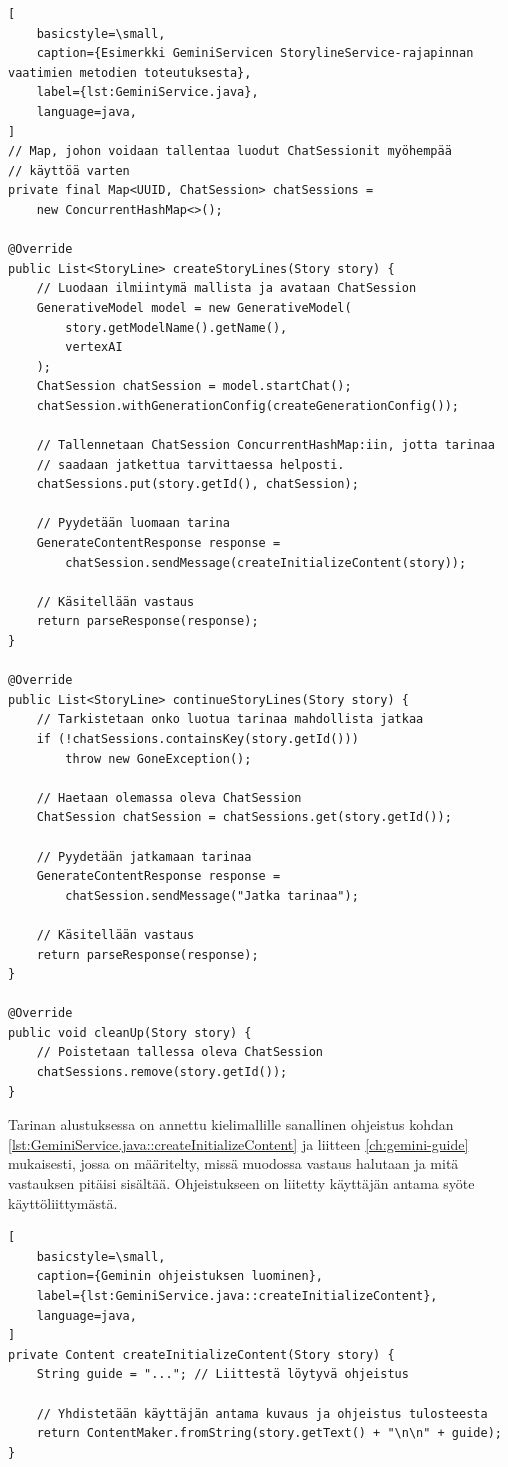 \begin{lstlisting}[
    basicstyle=\small,
    caption={Esimerkki GeminiServicen StorylineService-rajapinnan vaatimien metodien toteutuksesta},
    label={lst:GeminiService.java},
    language=java,
]
// Map, johon voidaan tallentaa luodut ChatSessionit myöhempää
// käyttöä varten
private final Map<UUID, ChatSession> chatSessions =
    new ConcurrentHashMap<>();

@Override
public List<StoryLine> createStoryLines(Story story) {
    // Luodaan ilmiintymä mallista ja avataan ChatSession
    GenerativeModel model = new GenerativeModel(
        story.getModelName().getName(),
        vertexAI
    );
    ChatSession chatSession = model.startChat();
    chatSession.withGenerationConfig(createGenerationConfig());

    // Tallennetaan ChatSession ConcurrentHashMap:iin, jotta tarinaa
    // saadaan jatkettua tarvittaessa helposti.
    chatSessions.put(story.getId(), chatSession);

    // Pyydetään luomaan tarina
    GenerateContentResponse response =
        chatSession.sendMessage(createInitializeContent(story));

    // Käsitellään vastaus
    return parseResponse(response);
}

@Override
public List<StoryLine> continueStoryLines(Story story) {
    // Tarkistetaan onko luotua tarinaa mahdollista jatkaa
    if (!chatSessions.containsKey(story.getId()))
        throw new GoneException();

    // Haetaan olemassa oleva ChatSession
    ChatSession chatSession = chatSessions.get(story.getId());

    // Pyydetään jatkamaan tarinaa
    GenerateContentResponse response =
        chatSession.sendMessage("Jatka tarinaa");

    // Käsitellään vastaus
    return parseResponse(response);
}

@Override
public void cleanUp(Story story) {
    // Poistetaan tallessa oleva ChatSession
    chatSessions.remove(story.getId());
}
\end{lstlisting}

Tarinan alustuksessa on annettu kielimallille sanallinen ohjeistus kohdan
\ref{lst:GeminiService.java::createInitializeContent} ja liitteen
\ref{ch:gemini-guide} mukaisesti, jossa on määritelty, missä muodossa vastaus
halutaan ja mitä vastauksen pitäisi sisältää. Ohjeistukseen on liitetty
käyttäjän antama syöte käyttöliittymästä.

\begin{lstlisting}[
    basicstyle=\small,
    caption={Geminin ohjeistuksen luominen},
    label={lst:GeminiService.java::createInitializeContent},
    language=java,
]
private Content createInitializeContent(Story story) {
    String guide = "..."; // Liittestä löytyvä ohjeistus

    // Yhdistetään käyttäjän antama kuvaus ja ohjeistus tulosteesta
    return ContentMaker.fromString(story.getText() + "\n\n" + guide);
}
\end{lstlisting}

